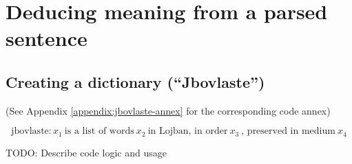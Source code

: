 \chapter{Deducing meaning from a parsed sentence}

\section{Creating a dictionary (``Jbovlaste'')}
\label{sec:creating_a_dictionary}

(See Appendix \ref{appendix:jbovlaste-annex} for the corresponding code annex)

$$\text{jbovlaste}: x_1 \: \text{is a list of words} \: x_2 \: \text{in Lojban, in order} \: x_3 \: \text{, preserved in medium} \: x_4$$

TODO: Describe code logic and usage
